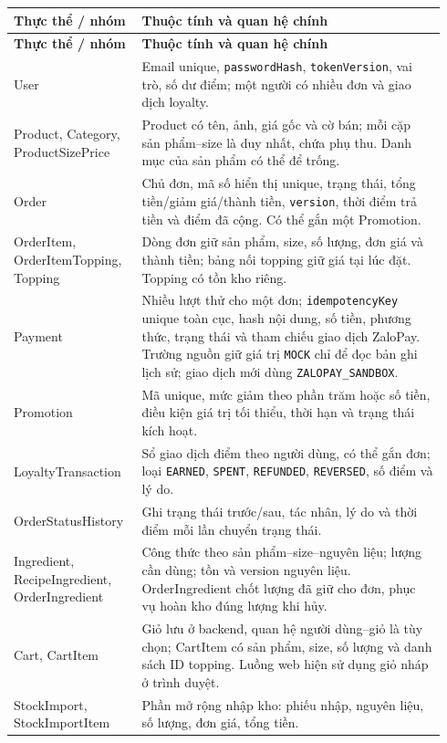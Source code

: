 \begin{longtable}{@{}p{0.27\linewidth}p{0.67\linewidth}@{}}
\toprule
\textbf{Thực thể / nhóm} & \textbf{Thuộc tính và quan hệ chính} \\
\midrule
\endfirsthead
\toprule
\textbf{Thực thể / nhóm} & \textbf{Thuộc tính và quan hệ chính} \\
\midrule
\endhead
User & Email unique, \texttt{passwordHash}, \texttt{tokenVersion}, vai trò, số dư điểm; một người có nhiều đơn và giao dịch loyalty. \\
Product, Category, ProductSizePrice & Product có tên, ảnh, giá gốc và cờ bán; mỗi cặp sản phẩm--size là duy nhất, chứa phụ thu. Danh mục của sản phẩm có thể để trống. \\
Order & Chủ đơn, mã số hiển thị unique, trạng thái, tổng tiền/giảm giá/thành tiền, \texttt{version}, thời điểm trả tiền và điểm đã cộng. Có thể gắn một Promotion. \\
OrderItem, OrderItemTopping, Topping & Dòng đơn giữ sản phẩm, size, số lượng, đơn giá và thành tiền; bảng nối topping giữ giá tại lúc đặt. Topping có tồn kho riêng. \\
Payment & Nhiều lượt thử cho một đơn; \texttt{idempotencyKey} unique toàn cục, hash nội dung, số tiền, phương thức, trạng thái và tham chiếu giao dịch ZaloPay. Trường nguồn giữ giá trị \texttt{MOCK} chỉ để đọc bản ghi lịch sử; giao dịch mới dùng \texttt{ZALOPAY\_SANDBOX}. \\
Promotion & Mã unique, mức giảm theo phần trăm hoặc số tiền, điều kiện giá trị tối thiểu, thời hạn và trạng thái kích hoạt. \\
LoyaltyTransaction & Sổ giao dịch điểm theo người dùng, có thể gắn đơn; loại \texttt{EARNED}, \texttt{SPENT}, \texttt{REFUNDED}, \texttt{REVERSED}, số điểm và lý do. \\
OrderStatusHistory & Ghi trạng thái trước/sau, tác nhân, lý do và thời điểm mỗi lần chuyển trạng thái. \\
Ingredient, RecipeIngredient, OrderIngredient & Công thức theo sản phẩm--size--nguyên liệu; lượng cần dùng; tồn và version nguyên liệu. OrderIngredient chốt lượng đã giữ cho đơn, phục vụ hoàn kho đúng lượng khi hủy. \\
Cart, CartItem & Giỏ lưu ở backend, quan hệ người dùng--giỏ là tùy chọn; CartItem có sản phẩm, size, số lượng và danh sách ID topping. Luồng web hiện sử dụng giỏ nháp ở trình duyệt. \\
StockImport, StockImportItem & Phần mở rộng nhập kho: phiếu nhập, nguyên liệu, số lượng, đơn giá, tổng tiền. \\
\bottomrule
\end{longtable}

